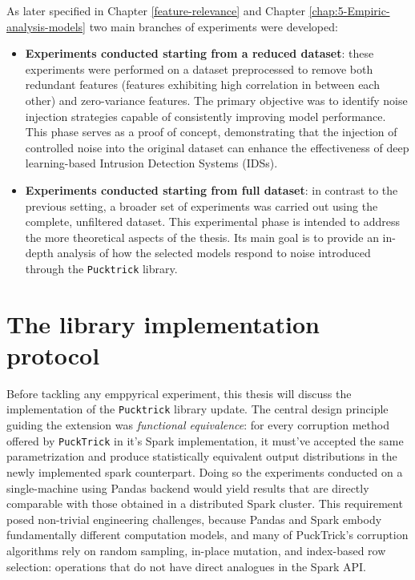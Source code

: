 \documentclass[../main.tex]{subfiles}
\begin{document}
As later specified in Chapter \ref{feature-relevance} and Chapter \ref{chap:5-Empiric-analysis-models} two main branches of experiments were developed:
\begin{itemize}
    \item {} \textbf{Experiments conducted starting from a reduced dataset}: these experiments were performed on a dataset preprocessed to remove both redundant features (features exhibiting high correlation in between each other) and zero-variance features. The primary objective was to identify noise injection strategies capable of consistently improving model performance. This phase serves as a proof of concept, demonstrating that the injection of controlled noise into the original dataset can enhance the effectiveness of deep learning-based Intrusion Detection Systems (IDSs).

    \item {} \textbf{Experiments conducted starting from full dataset}: in contrast to the previous setting, a broader set of experiments was carried out using the complete, unfiltered dataset. This experimental phase is intended to address the more theoretical aspects of the thesis. Its main goal is to provide an in-depth analysis of how the selected models respond to noise introduced through the \texttt{Pucktrick} library.
\end{itemize}


\newpage
\section{The library implementation protocol}
Before tackling any emppyrical experiment, this thesis will discuss the implementation of the \texttt{Pucktrick} library update. The central design principle guiding the extension was \emph{functional equivalence}: for every corruption method offered by \texttt{PuckTrick} in it's Spark implementation, it must've accepted the same parametrization and produce statistically equivalent output distributions in the newly implemented spark counterpart. Doing so the experiments conducted on a single-machine using Pandas backend would yield results that are directly comparable with those obtained in a distributed Spark cluster.  This requirement posed non-trivial engineering challenges, because Pandas and Spark embody fundamentally different computation models, and many of PuckTrick's corruption algorithms rely on random sampling, in-place mutation, and index-based row selection: operations that do not have direct analogues in the Spark API.
\end{document}
